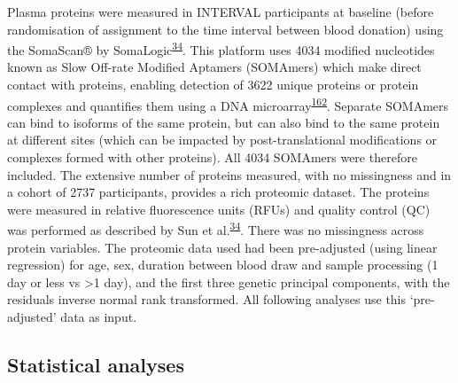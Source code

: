 \documentclass[11pt,twoside]{bristolthesis}
\begin{document}
Plasma proteins were measured in INTERVAL participants at baseline (before randomisation of assignment to the time interval between blood donation) using the SomaScan® by SomaLogic\textsuperscript{\protect\hyperlink{ref-Sun2018}{34}}. This platform uses 4034 modified nucleotides known as Slow Off-rate Modified Aptamers (SOMAmers) which make direct contact with proteins, enabling detection of 3622 unique proteins or protein complexes and quantifies them using a DNA microarray\textsuperscript{\protect\hyperlink{ref-Rohloff2014}{162}}. Separate SOMAmers can bind to isoforms of the same protein, but can also bind to the same protein at different sites (which can be impacted by post-translational modifications or complexes formed with other proteins). All 4034 SOMAmers were therefore included. The extensive number of proteins measured, with no missingness and in a cohort of 2737 participants, provides a rich proteomic dataset. The proteins were measured in relative fluorescence units (RFUs) and quality control (QC) was performed as described by Sun et al.\textsuperscript{\protect\hyperlink{ref-Sun2018}{34}}. There was no missingness across protein variables. The proteomic data used had been pre-adjusted (using linear regression) for age, sex, duration between blood draw and sample processing (1 day or less vs \textgreater1 day), and the first three genetic principal components, with the residuals inverse normal rank transformed. All following analyses use this `pre-adjusted' data as input.

\hypertarget{statistical-analyses}{%
\subsection{Statistical analyses}\label{statistical-analyses}}
\end{document}
